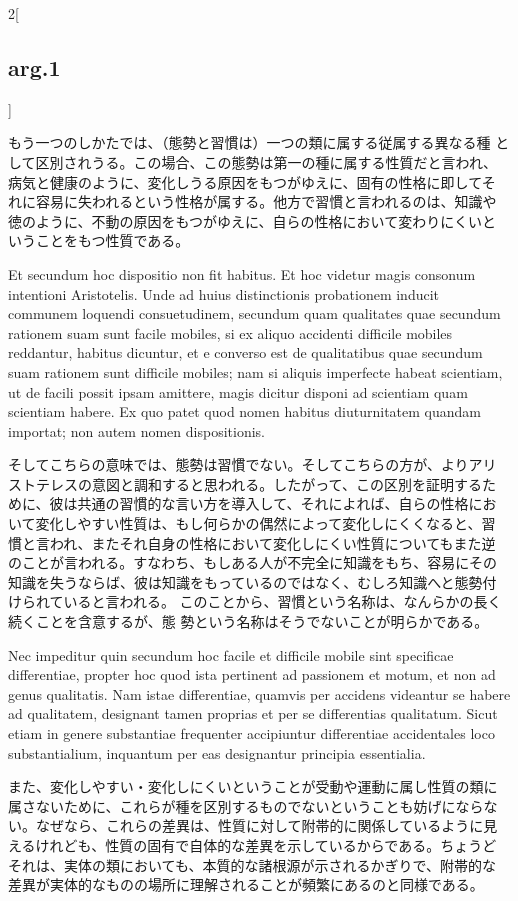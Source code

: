 \documentclass[paper=a4paper,fontsize=10pt,jafontsize=9pt,titlepage]{jlreq}
\begin{document}
\begin{paracol}{2}[\subsection{arg.1}]
\switchcolumn

もう一つのしかたでは、（態勢と習慣は）一つの類に属する従属する異なる種
として区別されうる。この場合、この態勢は第一の種に属する性質だと言われ、
病気と健康のように、変化しうる原因をもつがゆえに、固有の性格に即してそ
れに容易に失われるという性格が属する。他方で習慣と言われるのは、知識や
徳のように、不動の原因をもつがゆえに、自らの性格において変わりにくいと
いうことをもつ性質である。

\switchcolumn*

Et secundum hoc dispositio non fit habitus. Et hoc videtur
magis consonum intentioni Aristotelis. Unde ad huius distinctionis
probationem inducit communem loquendi consuetudinem, secundum quam
qualitates quae secundum rationem suam sunt facile mobiles, si ex
aliquo accidenti difficile mobiles reddantur, habitus dicuntur, et e
converso est de qualitatibus quae secundum suam rationem sunt
difficile mobiles; nam si aliquis imperfecte habeat scientiam, ut de
facili possit ipsam amittere, magis dicitur disponi ad scientiam quam
scientiam habere. 
Ex quo patet quod nomen habitus diuturnitatem
quandam importat; non autem nomen dispositionis.

\switchcolumn

そしてこちらの意味では、態勢は習慣でない。そしてこちらの方が、よりアリ
ストテレスの意図と調和すると思われる。したがって、この区別を証明するた
めに、彼は共通の習慣的な言い方を導入して、それによれば、自らの性格にお
いて変化しやすい性質は、もし何らかの偶然によって変化しにくくなると、習
慣と言われ、またそれ自身の性格において変化しにくい性質についてもまた逆
のことが言われる。すなわち、もしある人が不完全に知識をもち、容易にその
知識を失うならば、彼は知識をもっているのではなく、むしろ知識へと態勢付
けられていると言われる。
このことから、習慣という名称は、なんらかの長く続くことを含意するが、態
勢という名称はそうでないことが明らかである。

\switchcolumn*

Nec impeditur quin
secundum hoc facile et difficile mobile sint specificae differentiae,
propter hoc quod ista pertinent ad passionem et motum, et non ad genus
qualitatis. 
Nam istae differentiae, quamvis per accidens videantur se
habere ad qualitatem, designant tamen proprias et per se differentias
qualitatum. Sicut etiam in genere substantiae frequenter accipiuntur
differentiae accidentales loco substantialium, inquantum per eas
designantur principia essentialia.

\switchcolumn

また、変化しやすい・変化しにくいということが受動や運動に属し性質の類に
属さないために、これらが種を区別するものでないということも妨げにならな
い。なぜなら、これらの差異は、性質に対して附帯的に関係しているように見
えるけれども、性質の固有で自体的な差異を示しているからである。ちょうど
それは、実体の類においても、本質的な諸根源が示されるかぎりで、附帯的な
差異が実体的なものの場所に理解されることが頻繁にあるのと同様である。

\end{paracol}
\end{document}

